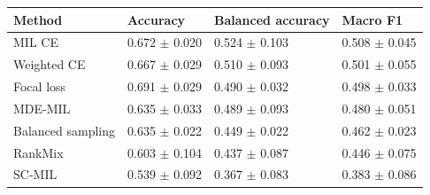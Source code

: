 \begin{tabular}{llll}
\toprule
Method & Accuracy & Balanced accuracy & Macro F1\\
\midrule
MIL CE & \num{0.672} $\pm$ \num{0.020} & \num{0.524} $\pm$ \num{0.103} & \num{0.508} $\pm$ \num{0.045}\\
Weighted CE & \num{0.667} $\pm$ \num{0.029} & \num{0.510} $\pm$ \num{0.093} & \num{0.501} $\pm$ \num{0.055}\\
Focal loss & \num{0.691} $\pm$ \num{0.029} & \num{0.490} $\pm$ \num{0.032} & \num{0.498} $\pm$ \num{0.033}\\
MDE-MIL & \num{0.635} $\pm$ \num{0.033} & \num{0.489} $\pm$ \num{0.093} & \num{0.480} $\pm$ \num{0.051}\\
Balanced sampling & \num{0.635} $\pm$ \num{0.022} & \num{0.449} $\pm$ \num{0.022} & \num{0.462} $\pm$ \num{0.023}\\
RankMix & \num{0.603} $\pm$ \num{0.104} & \num{0.437} $\pm$ \num{0.087} & \num{0.446} $\pm$ \num{0.075}\\
SC-MIL & \num{0.539} $\pm$ \num{0.092} & \num{0.367} $\pm$ \num{0.083} & \num{0.383} $\pm$ \num{0.086}\\
\bottomrule
\end{tabular}
